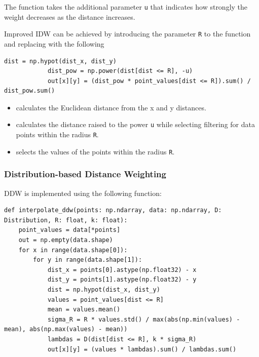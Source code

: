 The function takes the additional parameter \verb|u| that indicates how strongly the weight decreases as the distance increases.

\begin{minipage}{\textwidth}
Improved IDW can be achieved by introducing the parameter \verb|R| to the function and replacing  with the following
\begin{lstlisting}[language={[AS]Python},caption=Addition for Improved IDW]
            dist = np.hypot(dist_x, dist_y)
            dist_pow = np.power(dist[dist <= R], -u)
            out[x][y] = (dist_pow * point_values[dist <= R]).sum() / dist_pow.sum()
\end{lstlisting}
\end{minipage}

\begin{itemize}
    \item {} calculates the Euclidean distance from the x and y distances.
    \item {} calculates the distance raised to the power \verb|u| while selecting filtering for data points within the radius \verb|R|.
    \item {} selects the values of the points within the radius \verb|R|.
\end{itemize}

\subsubsection{Distribution-based Distance Weighting}

DDW is implemented using the following function:
\begin{lstlisting}[language={[AS]Python},caption=Interpolation with DDW]
def interpolate_ddw(points: np.ndarray, data: np.ndarray, D: Distribution, R: float, k: float):
    point_values = data[*points]
    out = np.empty(data.shape)
    for x in range(data.shape[0]):
        for y in range(data.shape[1]):
            dist_x = points[0].astype(np.float32) - x
            dist_y = points[1].astype(np.float32) - y
            dist = np.hypot(dist_x, dist_y)
            values = point_values[dist <= R]
            mean = values.mean()
            sigma_R = R * values.std() / max(abs(np.min(values) - mean), abs(np.max(values) - mean))
            lambdas = D(dist[dist <= R], k * sigma_R)
            out[x][y] = (values * lambdas).sum() / lambdas.sum()
\end{lstlisting}

